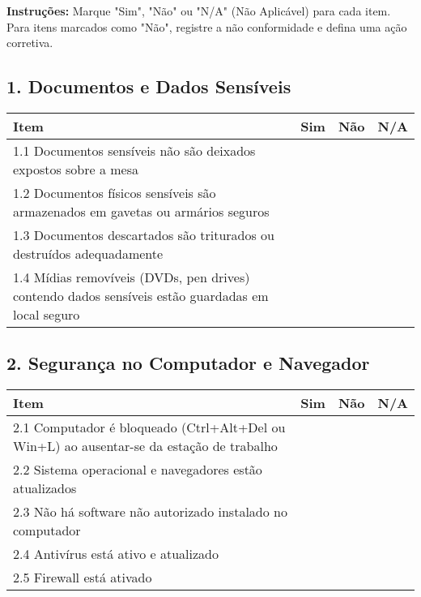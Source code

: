 \documentclass[12pt,a4paper]{report}
\begin{document}
\begin{tcolorbox}[colback=boxcolor,colframe=sectioncolor,arc=2mm,title=\textbf{CHECKLIST MENSAL DE SEGURANÇA DA INFORMAÇÃO}]

\textbf{Instruções:} Marque "Sim", "Não" ou "N/A" (Não Aplicável) para cada item. Para itens marcados como "Não", registre a não conformidade e defina uma ação corretiva.

\subsection*{1. Documentos e Dados Sensíveis}
\begin{tabular}{|p{8cm}|p{1cm}|p{1cm}|p{1cm}|}
\hline
\textbf{Item} & \textbf{Sim} & \textbf{Não} & \textbf{N/A} \\
\hline
1.1 Documentos sensíveis não são deixados expostos sobre a mesa & & & \\
\hline
1.2 Documentos físicos sensíveis são armazenados em gavetas ou armários seguros & & & \\
\hline
1.3 Documentos descartados são triturados ou destruídos adequadamente & & & \\
\hline
1.4 Mídias removíveis (DVDs, pen drives) contendo dados sensíveis estão guardadas em local seguro & & & \\
\hline
\end{tabular}

\subsection*{2. Segurança no Computador e Navegador}
\begin{tabular}{|p{8cm}|p{1cm}|p{1cm}|p{1cm}|}
\hline
\textbf{Item} & \textbf{Sim} & \textbf{Não} & \textbf{N/A} \\
\hline
2.1 Computador é bloqueado (Ctrl+Alt+Del ou Win+L) ao ausentar-se da estação de trabalho & & & \\
\hline
2.2 Sistema operacional e navegadores estão atualizados & & & \\
\hline
2.3 Não há software não autorizado instalado no computador & & & \\
\hline
2.4 Antivírus está ativo e atualizado & & & \\
\hline
2.5 Firewall está ativado & & & \\
\hline
\end{tabular}


\end{tcolorbox}
\end{document}
